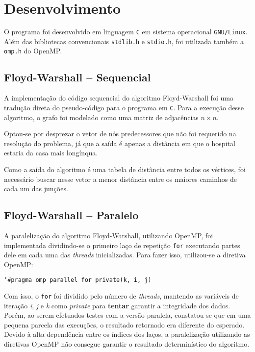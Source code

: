 \section{Desenvolvimento}

O programa foi desenvolvido em linguagem \texttt{C} em sistema operacional \texttt{GNU/Linux}. Além das bibliotecas convencionais \texttt{stdlib.h} e \texttt{stdio.h}, foi utilizada também a \texttt{omp.h} do OpenMP.

\subsection{Floyd-Warshall -- Sequencial}

A implementação do código sequencial do algoritmo Floyd-Warshall foi uma tradução direta do pseudo-código para o programa em \texttt{C}. Para a execução desse algoritmo, o grafo foi modelado como uma matriz de adjacências $n \times n$.

Optou-se por desprezar o vetor de nós predecessores que não foi requerido na resolução do problema, já que a saída é apenas a distância em que o hospital estaria da casa mais longínqua.

Como a saída do algoritmo é uma tabela de distância entre todos os vértices, foi necessário buscar nesse vetor a menor distância entre os maiores caminhos de cada um das junções.

\subsection{Floyd-Warshall -- Paralelo \label{problema}}

A paralelização do algoritmo Floyd-Warshall, utilizando OpenMP, foi implementada dividindo-se o primeiro laço de repetição \texttt{for} executando partes dele em cada uma das \textit{threads} inicializadas. Para fazer isso, utilizou-se a diretiva OpenMP:

\texttt{\char`\#pragma omp parallel for private(k, i, j)}

Com isso, o \texttt{for} foi dividido pelo número de \textit{threads}, mantendo as variáveis de iteração \textit{i}, \textit{j} e \textit{k} como \textit{private} para \textbf{tentar} garantir a integridade dos dados. Porém, ao serem efetuados testes com a versão paralela, constatou-se que em uma pequena parcela das execuções, o resultado retornado era diferente do esperado. Devido à alta dependência entre os índices dos laços, a paralelização utilizando as diretivas OpenMP não consegue garantir o resultado determinístico do algoritmo.

